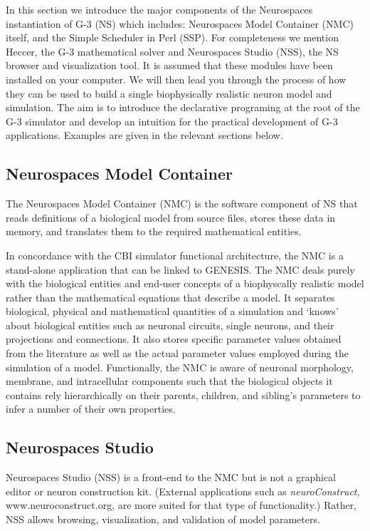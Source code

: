 \documentclass[12pt]{article}
\begin{document}
In this section we introduce the major components of the Neurospaces
instantiation of G-3 (NS) which includes: Neurospaces Model Container
(NMC) itself, and the Simple Scheduler in Perl (SSP). For completeness
we mention Heccer, the G-3 mathematical solver and Neurospaces Studio
(NSS), the NS browser and visualization tool. It is assumed that these
modules have been installed on your computer. We will then lead you
through the process of how they can be used to build a single
biophysically realistic neuron model and simulation. The aim is to
introduce the declarative programing at the root of the G-3 simulator
and develop an intuition for the practical development of G-3
applications. Examples are given in the relevant sections below.

\subsection{Neurospaces Model Container}
\label{sec:neur-model-cont}

The Neurospaces Model Container (NMC) is the software component of NS
that reads definitions of a biological model from source files, stores
these data in memory, and translates them to the required mathematical
entities.

In concordance with the CBI simulator functional architecture, the NMC
is a stand-alone application that can be linked to GENESIS.  The NMC
deals purely with the biological entities and end-user concepts
of a biophyscally realistic model rather than the mathematical
equations that describe a model.  It separates biological, physical
and mathematical quantities of a simulation and `knows' about
biological entities such as neuronal circuits, single neurons, and
their projections and connections.  It also stores specific parameter
values obtained from the literature as well as the actual parameter
values employed during the simulation of a model.  Functionally, the
NMC is aware of neuronal morphology, membrane, and intracellular
components such that the biological objects it contains rely
hierarchically on their parents, children, and sibling's parameters to
infer a number of their own properties.

\subsection{Neurospaces Studio}

Neurospaces Studio (NSS) is a front-end to the NMC but is not a
graphical editor or neuron construction kit. (External applications
such as {\it neuroConstruct}, www.neuroconstruct.org, are more suited
for that type of functionality.) Rather, NSS allows browsing,
visualization, and validation of model parameters.
\end{document}
